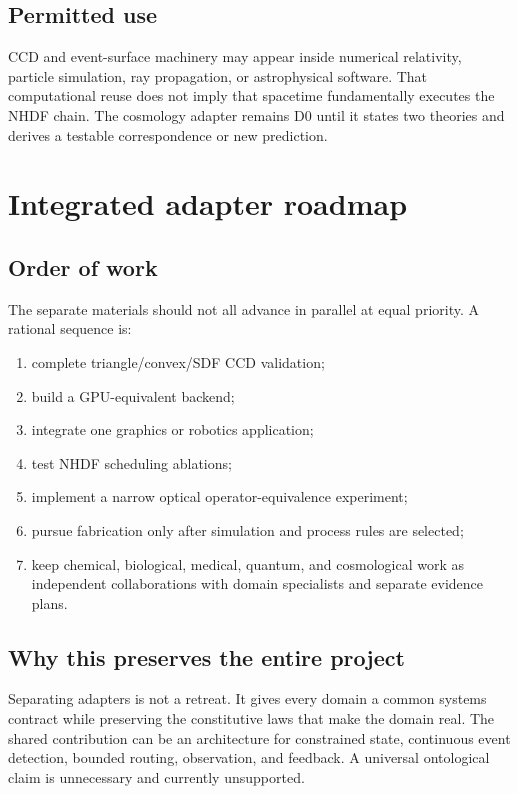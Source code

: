\documentclass[11pt,a4paper,openany]{book}
\begin{document}
\section{Permitted use}
CCD and event-surface machinery may appear inside numerical relativity, particle simulation, ray propagation, or astrophysical software. That computational reuse does not imply that spacetime fundamentally executes the NHDF chain. The cosmology adapter remains D0 until it states two theories and derives a testable correspondence or new prediction.

\chapter{Integrated adapter roadmap}
\section{Order of work}
The separate materials should not all advance in parallel at equal priority. A rational sequence is:
\begin{enumerate}
  \item complete triangle/convex/SDF CCD validation;
  \item build a GPU-equivalent backend;
  \item integrate one graphics or robotics application;
  \item test NHDF scheduling ablations;
  \item implement a narrow optical operator-equivalence experiment;
  \item pursue fabrication only after simulation and process rules are selected;
  \item keep chemical, biological, medical, quantum, and cosmological work as independent collaborations with domain specialists and separate evidence plans.
\end{enumerate}

\section{Why this preserves the entire project}
Separating adapters is not a retreat. It gives every domain a common systems contract while preserving the constitutive laws that make the domain real. The shared contribution can be an architecture for constrained state, continuous event detection, bounded routing, observation, and feedback. A universal ontological claim is unnecessary and currently unsupported.
\end{document}
